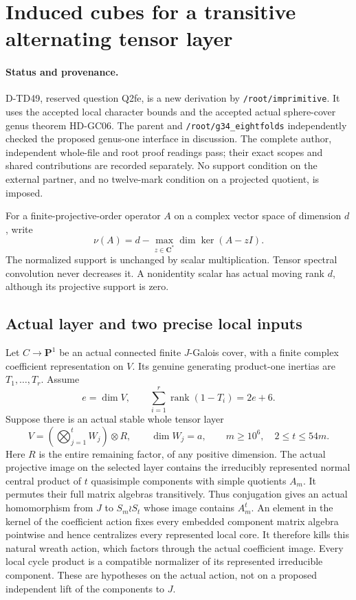 \section{Induced cubes for a transitive alternating tensor layer}
\label{sec:induced-cube-layer}

\paragraph{Status and provenance.}
D-TD49, reserved question Q2fe, is a new derivation by
\texttt{/root/imprimitive}.  It uses the accepted local character
bounds and the accepted actual sphere-cover genus theorem HD-GC06.
The parent and \texttt{/root/g34\_eightfolds} independently checked
the proposed genus-one interface in discussion.  The complete
author, independent whole-file and root proof readings pass;
their exact scopes and shared contributions are recorded separately.  No support condition
on the external partner, and no twelve-mark condition on a
projected quotient, is imposed.

For a finite-projective-order operator $A$ on a complex vector space
of dimension $d$, write
\[
 \nu(A)=d-\max_{z\in\mathbf C^*}\dim\ker(A-zI).
 \tag{ICL.1}
\]
The normalized support is unchanged by scalar multiplication.
Tensor spectral convolution never decreases it.  A nonidentity
scalar has actual moving rank $d$, although its projective support
is zero.

\subsection*{Actual layer and two precise local inputs}

Let $C\to\mathbf P^1$ be an actual connected finite $J$-Galois
cover, with a finite complex coefficient representation on $V$.
Its genuine generating product-one inertias are $T_1,\ldots,T_r$.
Assume
\[
 e=\dim V,\qquad
       \sum_{i=1}^r\operatorname{rank}(1-T_i)=2e+6.
 \tag{ICL.2}
\]
Suppose there is an actual stable whole tensor layer
\[
 V=\left(\bigotimes_{j=1}^t W_j\right)\otimes R,
 \qquad \dim W_j=a,\qquad
 m\ge10^6,\quad 2\le t\le54m.
 \tag{ICL.3}
\]
Here $R$ is the entire remaining factor, of any positive dimension.
The actual projective image on the selected layer contains the
irreducibly represented normal central product of $t$ quasisimple
components with simple quotients $A_m$.  It permutes their full
matrix algebras transitively.  Thus conjugation gives an actual
homomorphism from $J$ to $S_m\wr S_t$ whose image contains $A_m^t$.
An element in the kernel of the coefficient action fixes every
embedded component matrix algebra pointwise and hence centralizes
every represented local core.  It therefore kills this natural
wreath action, which factors through the actual coefficient image.
Every local cycle product is a compatible normalizer of its
represented irreducible component.  These are hypotheses on the
actual action, not on a proposed independent lift of the components
to $J$.

